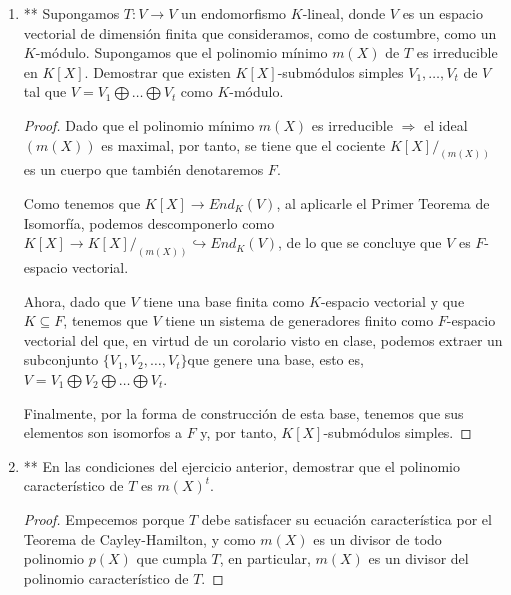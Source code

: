 \documentclass[paper=a4, fontsize=11pt, spanish]{scrartcl}
\begin{document}
\begin{enumerate}
\begin{proof}[Solución]
			Como $N_p$ es un submódulo debe ser cerrado para $T$, luego se tiene
			que $\delta p(x) = kx^{k-1} + (k-1)a_{k-1}x^{k-2} + \cdots + 2a_2x+a_1 \in N_p$ y análogamente se
			deduce que$\delta^2 p(x), \dots, \delta^{k} \in N_p$, es decir, $<\{p, \delta p, \delta^2 p, \dots,
			\delta^k p\}> \subseteq N_p$.
			
			Entonces, es inmediato comprobar que $ <M_k> \cong <\{p, \delta p, \delta^2 p, \dots, \delta^k p\}>$,
			y se tiene que $<M_k> \subseteq N_p$ pero por cómo hemos definido $N_p$ se deduce que $<M_k> = N_p$.
		\end{proof}
		
		\item ** Supongamos $T: V \rightarrow V$ un endomorfismo $K$-lineal, donde $V$ es un espacio vectorial de
		dimensión finita que consideramos, como de costumbre, como un $K$-módulo. Supongamos que el polinomio
		mínimo $m(X)$ de $T$ es irreducible en $K[X]$. Demostrar que existen $K[X]$-submódulos simples $V_1,
		\dots, V_t$ de $V$ tal que $V = V_1 \bigoplus \dots \bigoplus V_t$ como $K$-módulo.
		\begin{proof}
			Dado que el polinomio mínimo $m(X)$ es irreducible $\Rightarrow$ el ideal $(m(X))$ es maximal, por
			tanto, se tiene que el cociente $K[X]/_{(m(X))}$ es un cuerpo que también denotaremos $F$.
			
			Como tenemos que $K[X] \rightarrow End_K(V)$, al aplicarle el Primer Teorema de Isomorfía, podemos
			descomponerlo como $K[X] \rightarrow K[X]/_{(m(X))} \hookrightarrow End_K(V)$, de lo que se concluye
			que $V$ es $F$-espacio vectorial.
			
			Ahora, dado que $V$ tiene una base finita como $K$-espacio vectorial y que $K \subseteq F$, tenemos
			que $V$ tiene un sistema de generadores finito como $F$-espacio vectorial del que, en virtud de un
			corolario visto en clase, podemos extraer un subconjunto $\{V_1, V_2, \dots, V_t\}$que genere una
			base, esto es, $V = V_1 \bigoplus V_2 \bigoplus \dots \bigoplus V_t$.
			
			Finalmente, por la forma de construcción de esta base, tenemos que sus elementos son isomorfos a
			$F$ y, por tanto, $K[X]$-submódulos simples.
		\end{proof}
		
		\item ** En las condiciones del ejercicio anterior, demostrar que el polinomio característico de $T$ es
		$m(X)^t$.
		\begin{proof}
			Empecemos porque $T$ debe satisfacer su ecuación característica por el Teorema de Cayley-Hamilton,
			y como $m(X)$ es un divisor de todo polinomio $p(X)$ que cumpla $T$, en particular, $m(X)$ es un
			divisor del polinomio característico de $T$.
			

\end{proof}
\end{enumerate}
\end{document}
